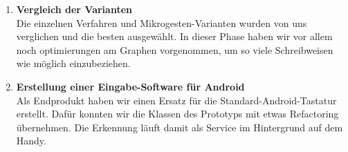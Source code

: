 \begin{enumerate}
\item  \textbf{Vergleich der Varianten} \\
Die einzelnen Verfahren und Mikrogesten-Varianten wurden von uns verglichen und die besten ausgewählt. In dieser Phase haben wir vor allem noch optimierungen am Graphen vorgenommen, um so viele Schreibweisen wie möglich einzubeziehen.

\item \textbf{Erstellung einer Eingabe-Software für Android} \\
Als Endprodukt haben wir einen Ersatz für die Standard-Android-Tastatur erstellt. Dafür konnten wir die Klassen des Prototyps mit etwas Refactoring übernehmen. Die Erkennung läuft damit als Service im Hintergrund auf dem Handy. 

\end{enumerate}